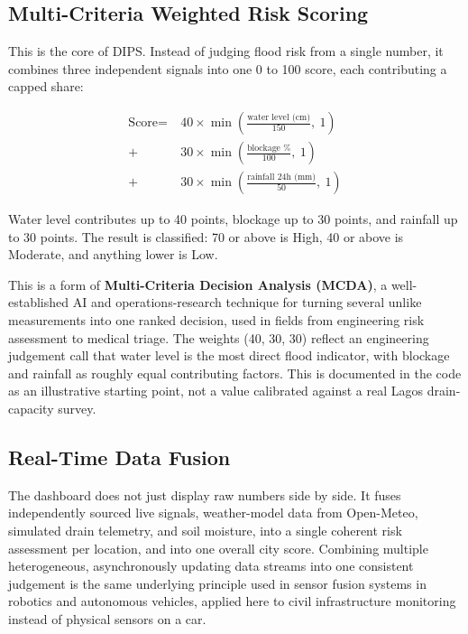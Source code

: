\documentclass[11pt]{article}
\begin{document}
\subsection{Multi-Criteria Weighted Risk Scoring}
This is the core of DIPS. Instead of judging flood risk from a single number, it combines three independent signals into one 0 to 100 score, each contributing a capped share:

\begin{align*}
\text{Score} = \ & 40 \times \min\!\left(\frac{\text{water level (cm)}}{150},\ 1\right) \\
+\ & 30 \times \min\!\left(\frac{\text{blockage \%}}{100},\ 1\right) \\
+\ & 30 \times \min\!\left(\frac{\text{rainfall 24h (mm)}}{50},\ 1\right)
\end{align*}

\noindent Water level contributes up to 40 points, blockage up to 30 points, and rainfall up to 30 points. The result is classified: 70 or above is High, 40 or above is Moderate, and anything lower is Low.

This is a form of \textbf{Multi-Criteria Decision Analysis (MCDA)}, a well-established AI and operations-research technique for turning several unlike measurements into one ranked decision, used in fields from engineering risk assessment to medical triage. The weights (40, 30, 30) reflect an engineering judgement call that water level is the most direct flood indicator, with blockage and rainfall as roughly equal contributing factors. This is documented in the code as an illustrative starting point, not a value calibrated against a real Lagos drain-capacity survey.

\subsection{Real-Time Data Fusion}
The dashboard does not just display raw numbers side by side. It fuses independently sourced live signals, weather-model data from Open-Meteo, simulated drain telemetry, and soil moisture, into a single coherent risk assessment per location, and into one overall city score. Combining multiple heterogeneous, asynchronously updating data streams into one consistent judgement is the same underlying principle used in sensor fusion systems in robotics and autonomous vehicles, applied here to civil infrastructure monitoring instead of physical sensors on a car.
\end{document}
